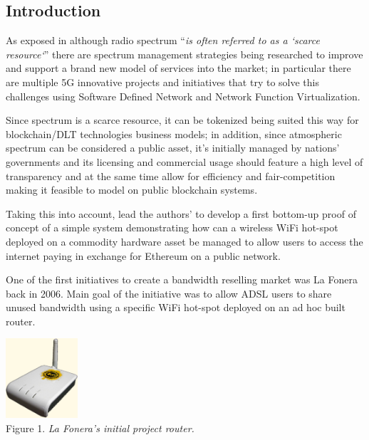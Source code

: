 \documentclass[12pt]{amsart}
\begin{document}
\newpage
\setlength{\columnsep}{20pt}
\begin{multicols}{2}
\section{Introduction}\label{sec:introduction}

\vspace{0.35cm}
As exposed in \cite{spectrumnh} although radio spectrum
``\textit{is often
  referred to as a `scarce resource`}'' there are
spectrum management strategies
being researched to improve and
support a brand new model of services
into the market; in particular there are
multiple 5G\cite{5g} innovative projects and initiatives
that try to solve this challenges using Software
Defined Network\cite{sdns}
and Network Function Virtualization\cite{nfv}.

\vspace{0.35cm}

Since spectrum is a scarce resource, it can
be tokenized being suited this
way for blockchain/DLT technologies business models;
in addition, since
atmospheric spectrum can be considered a public
asset, it's initially managed by nations' governments
and its licensing and commercial usage should feature
a high level of transparency and at the same time
allow for efficiency and fair-competition making it
feasible to model on public blockchain systems.

\vspace{0.35cm}

Taking this into account, lead the authors' to develop
a first bottom-up proof of concept of a simple system
demonstrating how can a wireless WiFi hot-spot
deployed on a commodity hardware asset\cite{RaspberryPi19}
be managed to allow users to access the internet
paying in exchange for Ethereum on a public network.

\vspace{0.35cm}

One of the first initiatives to create
a bandwidth reselling market was La Fonera\cite{fon}
back in 2006. Main goal of the initiative was
to allow ADSL users to share unused bandwidth using
a specific WiFi hot-spot deployed on an ad hoc
built router.

\begin{center}
  \includegraphics[keepaspectratio, width=0.2\textwidth]{images/lafonera-sourcewikipedia.eps}
  \\
  Figure 1. \textit{La Fonera's initial project router.}
\end{center}


\end{multicols}
\end{document}

